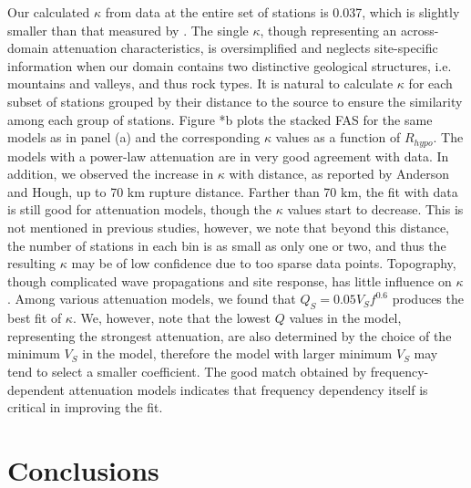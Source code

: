Our calculated $\kappa$ from data at the entire set of stations is 0.037, which is slightly smaller than that measured by \citet{anderson1984model}. The single $\kappa$, though representing an across-domain attenuation characteristics, is oversimplified and neglects site-specific information when our domain contains two distinctive geological structures, i.e. mountains and valleys, and thus rock types. It is natural to calculate $\kappa$ for each subset of stations grouped by their distance to the source to ensure the similarity among each group of stations. Figure *b plots the stacked FAS for the same models as in panel (a) and the corresponding $\kappa$ values as a function of $R_{hypo}$. The models with a power-law attenuation are in very good agreement with data. In addition, we observed the increase in $\kappa$ with distance, as reported by Anderson and Hough, up to 70 km rupture distance. Farther than 70 km, the fit with data is still good for attenuation models, though the $\kappa$ values start to decrease. This is not mentioned in previous studies, however, we note that beyond this distance, the number of stations in each bin is as small as only one or two, and thus the resulting $\kappa$ may be of low confidence due to too sparse data points. Topography, though complicated wave propagations and site response, has little influence on $\kappa$. Among various attenuation models, we found that $Q_S=0.05V_Sf^{0.6}$ produces the best fit of $\kappa$. We, however, note that the lowest $Q$ values in the model, representing the strongest attenuation, are also determined by the choice of the minimum $V_S$ in the model, therefore the model with larger minimum $V_S$ may tend to select a smaller coefficient. The good match obtained by frequency-dependent attenuation models indicates that frequency dependency itself is critical in improving the fit.

\section{Conclusions}


